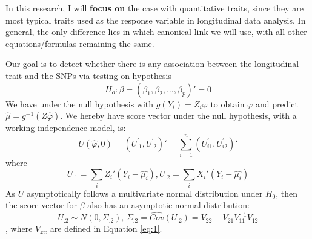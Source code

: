 \documentclass[compress]{beamer}
\begin{document}
{\framebreak
In this research, I will \textbf{focus on} the case with quantitative traits, since they are most typical traits used as the response variable in longitudinal data analysis. In general, the only difference lies in which canonical link we will use, with all other equations/formulas remaining the same.


\framebreak
\scriptsize
Our goal is to detect whether there is any association between the longitudinal trait and the SNPs via testing on hypothesis 
$$H_{o}:\beta=(\beta_{1},\beta_{2},\ldots,\beta_{p})'=0$$ 
We have under the null hypothesis with $g(Y_i)=Z_i\varphi$ to obtain $\varphi$ and predict $\hat{\mu}=g^{-1}(Z\hat{\varphi})$. We hereby have score vector under the null hypothesis, with a working independence model, is:
$$U(\hat{\varphi},0)=(U_{.1}^{'}, U_{.2}^{'})'=\sum_{i=1}^{n}(U_{i1}^{'},U_{i2}^{'})'$$
where
$$U_{.1}=\sum_{i}Z_{i}'(Y_{i}-\hat{\mu_{i}}), U_{.2}=\sum_{i}X_{i}'(Y_{i}-\hat{\mu_{i}})$$ 
As $U$ asymptotically follows a multivariate normal distribution under $H_{0}$, then the score vector for $\beta$ also has an asymptotic normal distribution:\\
$$
U_{.2}\sim N(0,\Sigma_{.2}),\,\Sigma_{.2}= \widehat{Cov} (U_{.2}) = V_{22} - V_{21} V_{11}^{-1} V_{12}
$$, where $V_{xx}$ are defined in Equation \ref{eq:1}.

}
\end{document}
